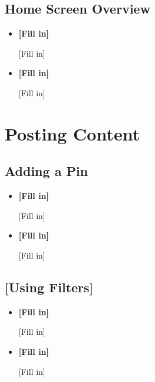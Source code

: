 \documentclass{article}
\begin{document}
\subsection{Home Screen Overview}
\begin{itemize}
    \item \textbf{[Fill in]}         
            
            [Fill in]
            
    \item \textbf{[Fill in]} 
            
            [Fill in]
            
\end{itemize}        

\section{Posting Content}
\subsection{Adding a Pin}
\begin{itemize}
    \item \textbf{[Fill in]}         
            
            [Fill in]
            
    \item \textbf{[Fill in]} 
            
            [Fill in]
            
\end{itemize}   
        
\subsection{[Using Filters]}
\begin{itemize}
    \item \textbf{[Fill in]}         
            
            [Fill in]
            
    \item \textbf{[Fill in]} 
            
            [Fill in]
            
\end{itemize}      
    
\end{document}
